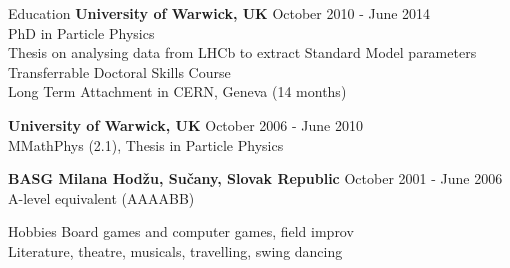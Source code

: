 \documentclass{format/resume} %
\begin{document}
\begin{rSection}{Education}
  {\bf University of Warwick, UK} \hfill {October 2010 - June 2014} \\
  PhD in Particle Physics \\
  Thesis on analysing data from LHCb to extract Standard Model parameters\\
  Transferrable Doctoral Skills Course \\
  Long Term Attachment in CERN, Geneva (14 months)

  {\bf University of Warwick, UK} \hfill {October 2006 - June 2010} \\
  MMathPhys (2.1), Thesis in Particle Physics

  {\bf BASG Milana Hod\v{z}u, Su\v{c}any, Slovak Republic} \hfill {October 2001 - June 2006} \\
  A-level equivalent (AAAABB)
\end{rSection}


\begin{rSection}{Hobbies}
  Board games and computer games, field improv \\
  Literature, theatre, musicals, travelling, swing dancing \\
\end{rSection}

\end{document}
